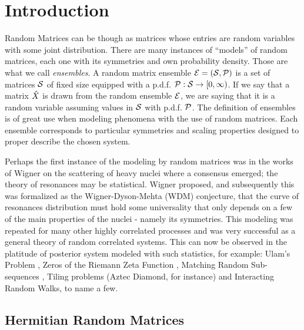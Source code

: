 \section{Introduction}

Random Matrices can be though as matrices whose entries are random variables with some joint distribution. There are many instances of \enquote{models} of random matrices, each one with its symmetries and own probability density. Those are what we call \textit{ensembles}. A random matrix ensemble $\mathcal{E} = (\mathcal{S}, \mathcal{P})$ is a set of matrices $\mathcal{S}$ of fixed size equipped with a p.d.f. $\mathcal{P}: \mathcal{S} \rightarrow [0, \infty)$. If we say that a matrix $\hat X$ is drawn from the random ensemble $\mathcal{E}$, we are saying that it is a random variable assuming values in $\mathcal{S}$ with p.d.f. $\mathcal{P}$. The definition of ensembles is of great use when modeling phenomena with the use of random matrices. Each ensemble corresponds to particular symmetries and scaling properties designed to proper describe the chosen system. 

Perhaps the first instance of the modeling by random matrices was in the works of Wigner on the scattering of heavy nuclei where a consensus emerged; the theory of resonances may be statistical. Wigner proposed, and subsequently this was formalized as the Wigner-Dyson-Mehta (WDM) conjecture, that the curve of resonances distribution must hold some universality that only depends on a few of the main properties of the nuclei - namely its symmetries. This modeling was repeated for many other highly correlated processes and was very successful as a general theory of random correlated systems. This can now be observed in the platitude of posterior system modeled with such statistics, for example: Ulam's Problem \cite{Ulam}, Zeros of the Riemann Zeta Function \cite{Montgomery}, Matching Random Sub-sequences \cite{majumdar2007randommatricesulamproblem}, Tiling problems (Aztec Diamond, for instance) and Interacting Random Walks, to name a few. 

\subsection{Hermitian Random Matrices}

